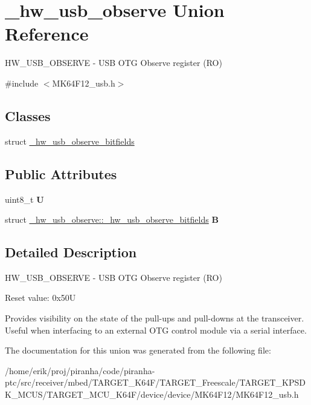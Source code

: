 \hypertarget{union__hw__usb__observe}{}\section{\+\_\+hw\+\_\+usb\+\_\+observe Union Reference}
\label{union__hw__usb__observe}


H\+W\+\_\+\+U\+S\+B\+\_\+\+O\+B\+S\+E\+R\+VE -\/ U\+SB O\+TG Observe register (RO)  




{\ttfamily \#include $<$M\+K64\+F12\+\_\+usb.\+h$>$}

\subsection*{Classes}
\begin{DoxyCompactItemize}
\item 
struct \hyperlink{struct__hw__usb__observe_1_1__hw__usb__observe__bitfields}{\+\_\+hw\+\_\+usb\+\_\+observe\+\_\+bitfields}
\end{DoxyCompactItemize}
\subsection*{Public Attributes}
\begin{DoxyCompactItemize}
\item 
uint8\+\_\+t {\bfseries U}\hypertarget{union__hw__usb__observe_a8b0b71d6ad50ad03068cf88a746815ad}{}\label{union__hw__usb__observe_a8b0b71d6ad50ad03068cf88a746815ad}

\item 
struct \hyperlink{struct__hw__usb__observe_1_1__hw__usb__observe__bitfields}{\+\_\+hw\+\_\+usb\+\_\+observe\+::\+\_\+hw\+\_\+usb\+\_\+observe\+\_\+bitfields} {\bfseries B}\hypertarget{union__hw__usb__observe_a2a31a727d686029674effc54fc28df7f}{}\label{union__hw__usb__observe_a2a31a727d686029674effc54fc28df7f}

\end{DoxyCompactItemize}


\subsection{Detailed Description}
H\+W\+\_\+\+U\+S\+B\+\_\+\+O\+B\+S\+E\+R\+VE -\/ U\+SB O\+TG Observe register (RO) 

Reset value\+: 0x50U

Provides visibility on the state of the pull-\/ups and pull-\/downs at the transceiver. Useful when interfacing to an external O\+TG control module via a serial interface. 

The documentation for this union was generated from the following file\+:\begin{DoxyCompactItemize}
\item 
/home/erik/proj/piranha/code/piranha-\/ptc/src/receiver/mbed/\+T\+A\+R\+G\+E\+T\+\_\+\+K64\+F/\+T\+A\+R\+G\+E\+T\+\_\+\+Freescale/\+T\+A\+R\+G\+E\+T\+\_\+\+K\+P\+S\+D\+K\+\_\+\+M\+C\+U\+S/\+T\+A\+R\+G\+E\+T\+\_\+\+M\+C\+U\+\_\+\+K64\+F/device/device/\+M\+K64\+F12/M\+K64\+F12\+\_\+usb.\+h\end{DoxyCompactItemize}
